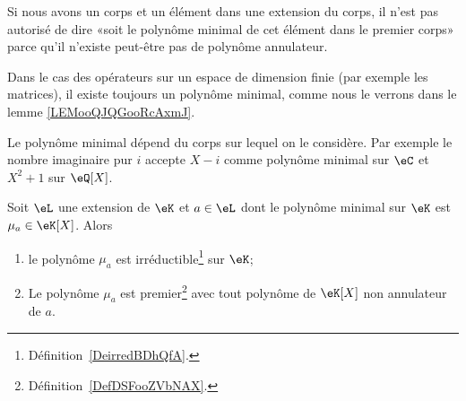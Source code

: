 Si nous avons un corps et un élément dans une extension du corps, il n'est pas autorisé de dire «soit le polynôme minimal de cet élément dans le premier corps» parce qu'il n'existe peut-être pas de polynôme annulateur.

\begin{normaltext}
	Dans le cas des opérateurs sur un espace de dimension finie (par exemple les matrices), il existe toujours un polynôme minimal, comme nous le verrons dans le lemme \ref{LEMooQJQGooRcAxmJ}.
\end{normaltext}

\begin{example}
	Le polynôme minimal dépend du corps sur lequel on le considère. Par exemple le nombre imaginaire pur \( i\) accepte \( X-i\) comme polynôme minimal sur \( \eC\) et \( X^2+1\) sur \( \eQ[X]\).
\end{example}

\begin{proposition}  \label{PropRARooKavaIT}
	Soit \( \eL\) une extension de \( \eK\) et \( a\in \eL\) dont le polynôme minimal sur \( \eK\) est \( \mu_a\in\eK[X]\). Alors
	\begin{enumerate}
		\item   \label{ItemDOQooYpLvXri}
		      le polynôme \( \mu_a\) est irréductible\footnote{Définition~\ref{DeirredBDhQfA}.} sur \( \eK\);
		\item
		      Le polynôme \( \mu_a\) est premier\footnote{Définition~\ref{DefDSFooZVbNAX}.} avec tout polynôme de \( \eK[X]\) non annulateur de \( a\).
	\end{enumerate}
\end{proposition}

